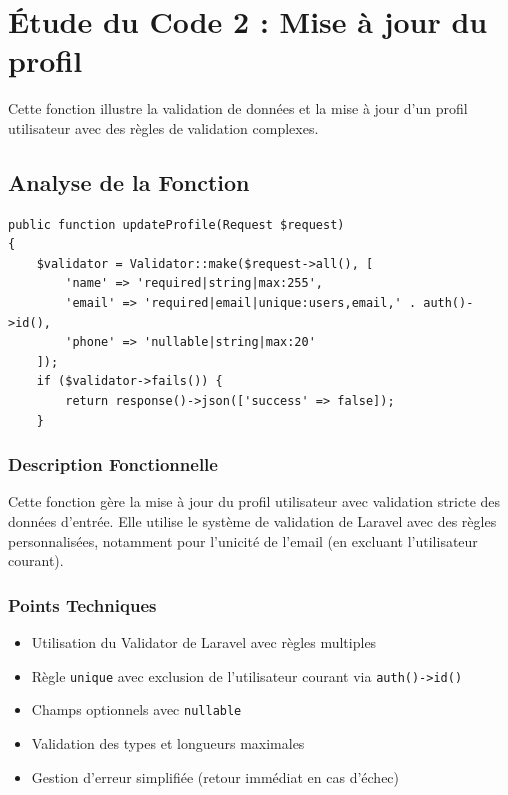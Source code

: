 \documentclass[12pt,a4paper]{report}
\begin{document}
\newpage
\section{Étude du Code 2 : Mise à jour du profil}

Cette fonction illustre la validation de données et la mise à jour d'un profil utilisateur avec des règles de validation complexes.

\subsection{Analyse de la Fonction}

\begin{lstlisting}[style=phpstyle, caption=Extrait de la fonction updateProfile]
public function updateProfile(Request $request)
{
    $validator = Validator::make($request->all(), [
        'name' => 'required|string|max:255',
        'email' => 'required|email|unique:users,email,' . auth()->id(),
        'phone' => 'nullable|string|max:20'
    ]);
    if ($validator->fails()) {
        return response()->json(['success' => false]);
    }
\end{lstlisting}

\subsubsection{Description Fonctionnelle}

Cette fonction gère la mise à jour du profil utilisateur avec validation stricte des données d'entrée. Elle utilise le système de validation de Laravel avec des règles personnalisées, notamment pour l'unicité de l'email (en excluant l'utilisateur courant).

\subsubsection{Points Techniques}

\begin{itemize}
    \item Utilisation du Validator de Laravel avec règles multiples
    \item Règle \texttt{unique} avec exclusion de l'utilisateur courant via \texttt{auth()->id()}
    \item Champs optionnels avec \texttt{nullable}
    \item Validation des types et longueurs maximales
    \item Gestion d'erreur simplifiée (retour immédiat en cas d'échec)
\end{itemize}
\end{document}
